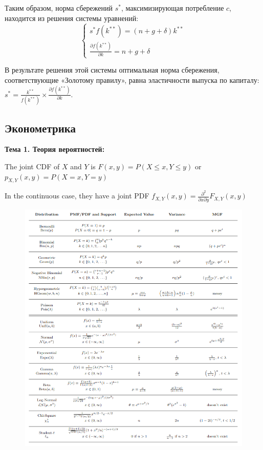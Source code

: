 \documentclass[a4paper,8pt]{article} %
\begin{document}
Таким образом, норма сбережений $s^{*}$, максимизирующая потребление $c$, находится из решения системы уравнений:
$$
\left\{\begin{array}{l}
s^{*} f\left(k^{* *}\right)=(n+g+\delta) k^{* *} \\
\frac{\partial f\left(k^{* *}\right)}{\partial k}=n+g+\delta
\end{array}\right.
$$

В результате решения этой системы оптимальная норма сбережения, соответствующие «Золотому правилу», равна эластичности выпуска по капиталу:  $s^{*}=\frac{k^{* *}}{f\left(k^{* *}\right)} \times \frac{\partial f\left(k^{* *}\right)}{\partial k} .$

\newpage

\hypertarget{ux44dux43aux43eux43dux43eux43cux435ux442ux440ux438ux43aux430}{%
\subsection*{Эконометрика}}

\textbf{Тема 1. Теория вероятностей:}


The joint CDF of $X$ and $Y$ is
$
F(x, y)=P(X \leq x, Y \leq y)
$ 
or $
p_{X, Y}(x, y)=P(X=x, Y=y)
$

In the continuous case, they have a joint PDF
$
f_{X, Y}(x, y)=\frac{\partial^{2}}{\partial x \partial y} F_{X, Y}(x, y)
$



\begin{figure}[H]
\centering
\includegraphics[width=0.9\linewidth]{screenshot001}
\label{fig:screenshot001}
\end{figure}
\end{document}
